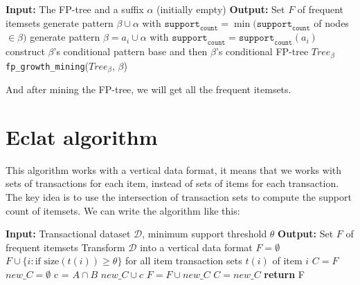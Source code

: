 \documentclass[12pt, openany]{report}
\theoremstyle{definition}
\begin{document}
\begin{algorithm}[H]
    \caption{\texttt{fp\_growth\_mining}(Tree, $\alpha$)}
    \begin{algorithmic}[1]
        \State \textbf{Input:} The FP-tree and a suffix $\alpha$ (initially empty)
        \State \textbf{Output:} Set $F$ of frequent itemsets
                \State generate pattern $\beta \cup \alpha$ with $\texttt{support}_{\texttt{count}} = \min(\texttt{support}_{\texttt{count}}$ of nodes $\in \beta)$ 
            \EndFor
        \Else
                \State generate pattern $\beta = a_i \cup \alpha$ with $\texttt{support}_{\texttt{count}} = \texttt{support}_{\texttt{count}}(a_i)$
                \State construct $\beta$'s conditional pattern base and then $\beta$'s conditional FP-tree $Tree_\beta$
                    \State \texttt{fp\_growth\_mining}($Tree_\beta$, $\beta$)
                \EndIf
            \EndFor
        \EndIf
    \end{algorithmic}
\end{algorithm}
And after mining the FP-tree, we will get all the frequent itemsets.
\section{Eclat algorithm}
This algorithm works with a vertical data format, it means that we works with sets of transactions for each item, instead of sets of items for each transaction. The key idea is to use the intersection of transaction sets to compute the support count of itemsets. We can write the algorithm like this:
\begin{algorithm}[H]
    \caption{\texttt{eclat\_algo}($\mathcal{D}$, $\theta$)}
    \begin{algorithmic}[1]
        \State \textbf{Input:} Transactional dataset $\mathcal{D}$, minimum support threshold $\theta$
        \State \textbf{Output:} Set $F$ of frequent itemsets
        \State Transform $\mathcal{D}$ into a vertical data format
        \State $F = \emptyset$
        \State $F \cup \{i: \text{if size}(t(i)) \geq \theta\}$ for all item transaction sets $t(i)$ of item $i$
        \State $C = F$
            \State $new\_C = \emptyset$
                \State c = $A \cap B$
                    \State $new\_C \cup c$
                \EndIf
            \EndFor
            \State $F = F \cup new\_C$
            \State $C = new\_C$
        \EndWhile
        \State \textbf{return} F
    \end{algorithmic}
\end{algorithm}
\end{document}

